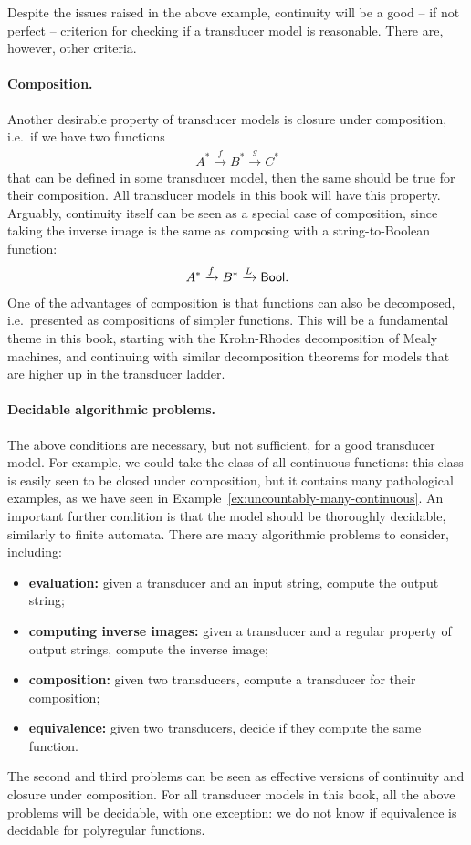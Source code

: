 Despite the issues raised in the above example, continuity will be a good -- if not perfect -- criterion for checking if a transducer model is reasonable.  There are, however, other criteria.

\paragraph*{Composition.} Another desirable property of transducer models is closure under composition, i.e.~if we have two functions 
\begin{align*}
A^* 
\xrightarrow f 
B^* 
\xrightarrow g 
C^*
\end{align*}
that can be defined in some transducer model, then the same should be true for their composition. All transducer models in this book will have this property.   Arguably, continuity itself can be seen as a special case of composition, since taking the inverse image is the same as composing with a string-to-Boolean function: \begin{align*}
A^* 
\xrightarrow f 
B^* 
\xrightarrow L
\mathsf{Bool}.
\end{align*} 
One of the advantages of composition is that functions can also be decomposed, i.e.~presented as compositions of simpler functions. This will be a fundamental theme in this book, starting with the Krohn-Rhodes decomposition of Mealy machines, and continuing with similar  decomposition theorems for models that are  higher up in the transducer ladder. 

\paragraph*{Decidable algorithmic problems.} The above conditions are necessary, but not sufficient, for a good transducer model. For example, we could take the class of all continuous functions: this class is easily seen to be closed under composition, but it contains many pathological examples, as we have seen in Example~\ref{ex:uncountably-many-continuous}. An important further condition is that the model should be thoroughly decidable, similarly to finite automata.  There are many algorithmic problems to consider, including:
\begin{itemize}
    \item \textbf{evaluation:} given a transducer and an input string, compute the output string;
    \item \textbf{computing inverse images:} given a transducer and a  regular property of output strings, compute the inverse image;
    \item \textbf{composition:} given two transducers, compute a transducer for their composition;
    \item \textbf{equivalence:} given two transducers, decide if they compute the same function.
\end{itemize}
The second and third problems can be seen as effective versions of  continuity and closure under composition. For all transducer models in this book, all the above problems will be decidable, with one exception: we do not know if equivalence is decidable for polyregular functions.

